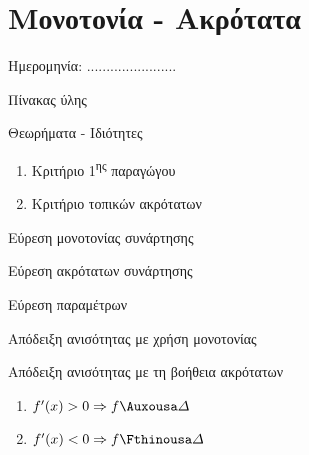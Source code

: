 \documentclass[twoside,nofonts,internet,math,spyros]{frontisthrio}
\newcommand{\tss}[1]{\textsuperscript{#1}}
\newcommand{\myitem}{\stepcounter{enumi}\item[\raisebox{0.5mm}{\faExclamationTriangle}\ \Large$\square$]}
\begin{document}
\section{Μονοτονία - Ακρότατα}
\begin{flushright}
\faCalendar* Ημερομηνία: .......................
\end{flushright}
\begin{mybox}[mysubtitle]{Πίνακας ύλης}
\begin{tcbraster}[raster columns=1,raster equal height]
\begin{myleftbox}{Θεωρήματα - Ιδιότητες\ \ \faTools}
\begin{enumerate}[itemsep=0mm]
\item Κριτήριο 1\tss{ης} παραγώγου
\item Κριτήριο τοπικών ακρότατων
\end{enumerate}
\end{myleftbox}
\end{tcbraster}
\begin{multicols}{2}
\begin{todolist}[itemsep=0mm]
\myitem Εύρεση μονοτονίας συνάρτησης
\myitem Εύρεση ακρότατων συνάρτησης
\item Εύρεση παραμέτρων
\item Απόδειξη ανισότητας με χρήση μονοτονίας
\item Απόδειξη ανισότητας με τη βοήθεια ακρότατων
\end{todolist}
\end{multicols}
\begin{multicols}{2}
\begin{enumerate}[itemsep=0mm]
\item $ f'(x)>0\Rightarrow f\Auxousa\varDelta $
\item $ f'(x)<0\Rightarrow f\Fthinousa\varDelta $
\end{enumerate}
\end{multicols}
\end{mybox}
\newpage
\thewrhmata
\end{document}
